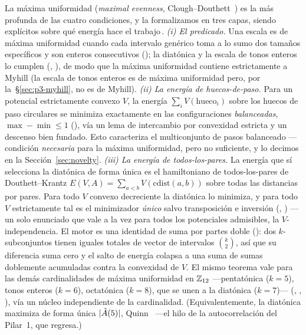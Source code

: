 La máxima uniformidad (\emph{maximal evenness}, Clough--Douthett~\cite{CloughDouthett}) es la más profunda
de las cuatro condiciones, y la formalizamos en tres capas, siendo explícitos sobre qué energía hace el
trabajo\,. \emph{(i) El predicado.} Una escala es de máxima uniformidad cuando
cada intervalo genérico toma a lo sumo dos tamaños específicos y son enteros consecutivos
(); la diatónica y la escala de tonos enteros lo cumplen (,
), de modo que la máxima uniformidad contiene estrictamente a Myhill (la escala
de tonos enteros es de máxima uniformidad pero, por la~\S\ref{sec:p3-myhill}, no es de Myhill). \emph{(ii)
La energía de huecos-de-paso.} Para un potencial estrictamente convexo $V$, la energía
$\sum_i V(\text{hueco}_i)$ sobre los huecos de paso circulares se minimiza exactamente en las
configuraciones \emph{balanceadas}, $\max-\min\le1$ (), vía un lema de
intercambio por convexidad estricta y un descenso bien fundado. Esto caracteriza el multiconjunto de pasos
balanceado ---condición \emph{necesaria} para la máxima uniformidad, pero no suficiente, y lo decimos en la
Sección~\ref{sec:novelty}. \emph{(iii) La energía de todos-los-pares.} La energía que sí selecciona la
diatónica de forma única es el hamiltoniano de todos-los-pares de Douthett--Krantz
$E(V,A)=\sum_{a<b}V(\mathrm{cdist}(a,b))$ sobre todas las distancias por pares. Para todo $V$ convexo
decreciente la diatónica lo minimiza, y para todo $V$ estrictamente tal es el minimizador \emph{único}
salvo transposición e inversión (, ) ---un solo
enunciado que vale a la vez para todos los potenciales admisibles, la $V$-independencia. El motor es una
identidad de suma por partes doble (): dos $k$-subconjuntos tienen iguales totales de
vector de intervalos $\binom{k}{2}$, así que su diferencia suma cero y el salto de energía colapsa a una
suma de sumas doblemente acumuladas contra la convexidad de $V$. El mismo teorema vale para las demás
cardinalidades de máxima uniformidad en $\mathbb{Z}_{12}$ ---pentatónica ($k=5$), tonos enteros ($k=6$),
octatónica ($k=8$), que se unen a la diatónica ($k=7$)--- (,
, ), vía un núcleo independiente de la cardinalidad.
(Equivalentemente, la diatónica maximiza de forma única $|\hat{A}(5)|$, Quinn~\cite{Quinn} ---el hilo de la
autocorrelación del Pilar~1, que regresa.)


